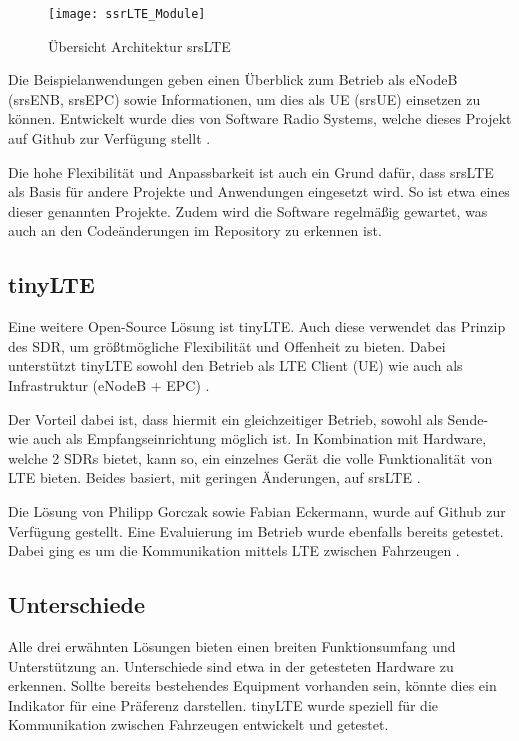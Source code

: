\begin{figure*}[ht]
	\centering
	\texttt{[image: ssrLTE\_Module]}
	\caption{Übersicht Architektur srsLTE \protect\cite{puschmann2017implementing}}
	\label{fig:modulessrsLTE}
\end{figure*}

Die Beispielanwendungen geben einen Überblick zum Betrieb als eNodeB (srsENB, srsEPC) sowie Informationen, um dies als UE (srsUE) einsetzen zu können. Entwickelt wurde dies von Software Radio Systems, welche dieses Projekt auf Github zur Verfügung stellt \cite{githubSrSLTE}.

Die hohe Flexibilität und Anpassbarkeit ist auch ein Grund dafür, dass srsLTE als Basis für andere Projekte und Anwendungen eingesetzt wird. So ist etwa  eines dieser genannten Projekte. Zudem wird die Software regelmäßig gewartet, was auch an den Codeänderungen im Repository zu erkennen ist. 

\subsection{tinyLTE}
\label{subsec:tinyLTE}
Eine weitere Open-Source Lösung ist tinyLTE. Auch diese verwendet das Prinzip des SDR, um größtmögliche Flexibilität und Offenheit zu bieten. Dabei unterstützt tinyLTE sowohl den Betrieb als LTE Client (UE) wie auch als Infrastruktur (eNodeB + EPC) \cite{eckermann2018tinylte}.

Der Vorteil dabei ist, dass hiermit ein gleichzeitiger Betrieb, sowohl als Sende- wie auch als Empfangseinrichtung möglich ist. In Kombination mit Hardware, welche 2 SDRs bietet, kann so, ein einzelnes Gerät die volle Funktionalität von LTE bieten. 
Beides basiert, mit geringen Änderungen, auf srsLTE \cite{gomez2016srslte}. 

Die Lösung von Philipp Gorczak sowie Fabian Eckermann, wurde auf Github zur Verfügung gestellt. Eine Evaluierung im Betrieb wurde ebenfalls bereits getestet. Dabei ging es um die Kommunikation mittels LTE zwischen Fahrzeugen \cite{tinyLteGithub}. 

\subsection{Unterschiede}
Alle drei erwähnten Lösungen bieten einen breiten Funktionsumfang und Unterstützung an. Unterschiede sind etwa in der getesteten Hardware zu erkennen. Sollte bereits bestehendes Equipment vorhanden sein, könnte dies ein Indikator für eine Präferenz darstellen. 
tinyLTE wurde speziell für die Kommunikation zwischen Fahrzeugen entwickelt und getestet. 